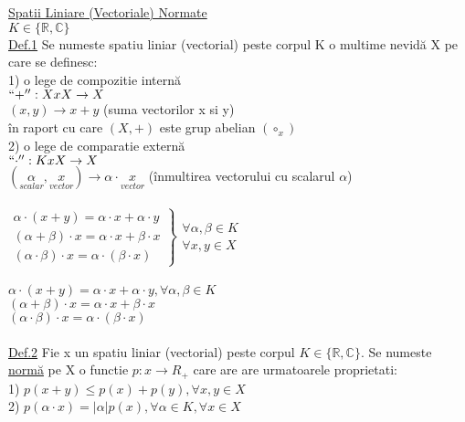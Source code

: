 \documentclass[12pt]{extarticle}
\begin{document}
	\huge \underline{Spatii Liniare (Vectoriale) Normate} \\
	{\large
		$K \in \{\mathbb{R}, \mathbb{C}\}$ \\
		\underline{Def.1} Se numeste spatiu liniar (vectorial) peste corpul K o multime nevidă X pe care se definesc: \\
		1) o lege de compozitie internă \\
		$``+'' : XxX \rightarrow X$ \\
		$(x, y) \rightarrow x + y$ (suma vectorilor x si y) \\
		în raport cu care $(X, +)$ este grup abelian $(\circ_{x})$ \\
		2) o lege de comparatie externă \\
		$``\cdot'' : KxX \rightarrow X$ \\
		$(\underset{scalar}{\alpha}, \underset{vector}{x}) \rightarrow \alpha \cdot \underset{vector}{x}$ (înmultirea vectorului cu scalarul $\alpha$) \\
		\\
		$
		\left.\begin{matrix}
		\alpha \cdot (x + y) = \alpha \cdot x + \alpha \cdot y \\ 
		(\alpha + \beta) \cdot x = \alpha \cdot x + \beta \cdot x \\ 
		(\alpha \cdot \beta) \cdot x = \alpha \cdot (\beta \cdot x)
		\end{matrix}\right\}\begin{matrix}
		\forall \alpha, \beta \in K \\ 
		\forall x, y \in X
		\end{matrix}
		$\\
		\\
		$\alpha \cdot (x + y) = \alpha \cdot x + \alpha \cdot y, \forall \alpha, \beta \in K$ \\
		$(\alpha + \beta) \cdot x = \alpha \cdot x + \beta \cdot x$ \\
		$(\alpha \cdot \beta) \cdot x = \alpha \cdot (\beta \cdot x)$ \\
		\\
		\underline{Def.2} Fie x un spatiu liniar (vectorial) peste corpul $K \in \{ \mathbb{R}, \mathbb{C}\}$. Se numeste \underline{normă} pe X o functie $p : x \to R_{+}$ care are are urmatoarele proprietati: \\
		1) $p(x + y) \leq p(x) + p(y), \forall x, y \in X$ \\
		2) $p(\alpha \cdot x) = |\alpha|p(x), \forall \alpha \in K, \forall x \in X$ \\
}
\end{document}
